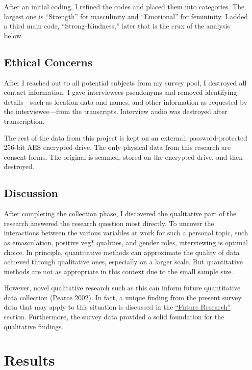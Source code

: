 \documentclass[twoside]{report}
\let\oldsection\section
\renewcommand\section{\clearpage\oldsection}
\begin{document}
After an initial coding, I refined the codes and
placed them into categories. The largest one is ``Strength'' for
masculinity and ``Emotional'' for femininity. I added a third main code,
``Strong-Kindness,'' later that is the crux of the analysis below.

\subsection{Ethical Concerns}

After I reached out to all potential subjects from my survey pool, I
destroyed all contact information. I gave interviewees pseudonyms and removed identifying details---such as location data and names, and
other information as requested by the interviewee---from the
transcripts. Interview audio was destroyed after transcription.

The rest of the data from this project is kept on an external, password-protected 256-bit AES encrypted drive. The only physical data from this research are consent forms. The original is scanned, stored on the encrypted drive, and then destroyed.

\subsection{Discussion}

After completing the collection phase, I discovered the qualitative part
of the research answered the research question most directly. To uncover
the interactions between the various variables at work for such a
personal topic, such as emasculation, positive veg* qualities, and
gender roles, interviewing is optimal choice. In principle, quantitative
methods can approximate the quality of data achieved through qualitative
ones, especially on a larger scale. But quantitative methods are not as
appropriate in this context due to the small sample size.

However, novel qualitative research such as this can inform future
quantitative data collection \hyperlink{pearce}{(Pearce 2002)}. In fact, a unique finding from the present survey data that may apply to this situation is discussed in the \hyperlink{future-research}{``Future Research''} section. Furthermore, the survey data provided a solid foundation for the qualitative findings.

\section{Results}
\end{document}
